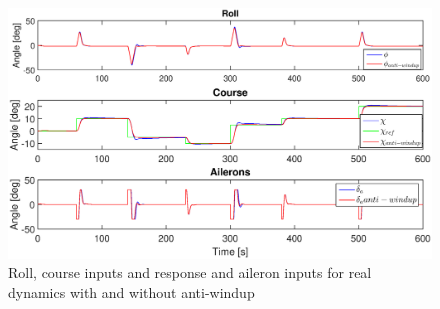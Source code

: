 \begin{figure}
    \centering
    \includegraphics[width=\textwidth]{prob2f.eps}
    \caption{Roll, course inputs and response and aileron inputs for real dynamics with and without anti-windup}
    \label{fig:response_2f}
\end{figure}
